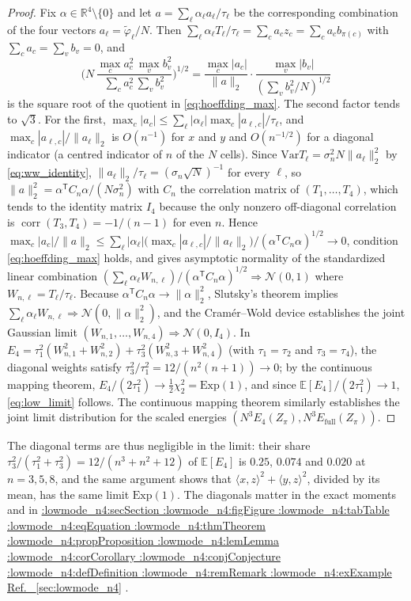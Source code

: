 \documentclass[11pt,a4paper]{article}
\makeatletter
\def\Cref@getprefix#1:#2\relax{#1}
\def\Cref@prefix@sec{sec}
\def\Cref@prefix@fig{fig}
\def\Cref@prefix@tab{tab}
\def\Cref@prefix@eq{eq}
\def\Cref@prefix@thm{thm}
\def\Cref@prefix@prop{prop}
\def\Cref@prefix@lem{lem}
\def\Cref@prefix@cor{cor}
\def\Cref@prefix@conj{conj}
\def\Cref@prefix@def{def}
\def\Cref@prefix@rem{rem}
\def\Cref@prefix@ex{ex}
\def\Cref@type@cap#1{%
  \edef\Cref@tmp{#1}%
  \ifx\Cref@tmp\Cref@prefix@sec Section%
  \else\ifx\Cref@tmp\Cref@prefix@fig Figure%
  \else\ifx\Cref@tmp\Cref@prefix@tab Table%
  \else\ifx\Cref@tmp\Cref@prefix@eq Equation%
  \else\ifx\Cref@tmp\Cref@prefix@thm Theorem%
  \else\ifx\Cref@tmp\Cref@prefix@prop Proposition%
  \else\ifx\Cref@tmp\Cref@prefix@lem Lemma%
  \else\ifx\Cref@tmp\Cref@prefix@cor Corollary%
  \else\ifx\Cref@tmp\Cref@prefix@conj Conjecture%
  \else\ifx\Cref@tmp\Cref@prefix@def Definition%
  \else\ifx\Cref@tmp\Cref@prefix@rem Remark%
  \else\ifx\Cref@tmp\Cref@prefix@ex Example%
  \else Ref.%
  \fi\fi\fi\fi\fi\fi\fi\fi\fi\fi\fi\fi
}
\DeclareRobustCommand{\Cref}[1]{%
  \begingroup
  \edef\Cref@label{#1}%
  \edef\Cref@prefix{\expandafter\Cref@getprefix\Cref@label:\relax}%
  \hyperref[#1]{\Cref@type@cap{\Cref@prefix}~\ref*{#1}}%
  \endgroup
}
\theoremstyle{plain}
\theoremstyle{definition}
\theoremstyle{remark}
\newcommand{\R}{\mathbb{R}}
\newcommand{\Var}{\mathrm{Var}}
\newcommand{\Efull}{E_{\mathrm{full}}}
\newcommand{\Efour}{E_4}
\newcommand{\E}{\mathbb{E}}
\makeatother
\begin{document}
\begin{proof}
Fix $\alpha\in\R^4\setminus\{0\}$ and let $a=\sum_\ell\alpha_\ell a_\ell/\tau_\ell$ be the corresponding combination of the four vectors $a_\ell=\tilde\varphi_\ell/N$.
Then $\sum_\ell\alpha_\ell T_\ell/\tau_\ell=\sum_ca_cz_c=\sum_ca_cb_{\pi(c)}$ with $\sum_ca_c=\sum_vb_v=0$, and
\[
\biggl(N\,\frac{\max_ca_c^2\,\max_vb_v^2}{\sum_ca_c^2\,\sum_vb_v^2}\biggr)^{1/2}=\frac{\max_c|a_c|}{\|a\|_2}\cdot\frac{\max_v|b_v|}{(\sum_vb_v^2/N)^{1/2}}
\]
is the square root of the quotient in \eqref{eq:hoeffding_max}.
The second factor tends to $\sqrt3$.
For the first, $\max_c|a_c|\le\sum_\ell|\alpha_\ell|\max_c|a_{\ell,c}|/\tau_\ell$, and $\max_c|a_{\ell,c}|/\|a_\ell\|_2$ is $O(n^{-1})$ for $x$ and $y$ and $O(n^{-1/2})$ for a diagonal indicator (a centred indicator of $n$ of the $N$ cells).
Since $\Var T_\ell=\sigma_n^2N\|a_\ell\|_2^2$ by \eqref{eq:ww_identity}, $\|a_\ell\|_2/\tau_\ell=(\sigma_n\sqrt N)^{-1}$ for every $\ell$, so $\|a\|_2^2=\alpha^{\mathsf T}C_n\alpha/(N\sigma_n^2)$ with $C_n$ the correlation matrix of $(T_1,\dots,T_4)$, which tends to the identity matrix $I_4$ because the only nonzero off-diagonal correlation is $\operatorname{corr}(T_3,T_4)=-1/(n-1)$ for even $n$.
Hence $\max_c|a_c|/\|a\|_2\le\sum_\ell|\alpha_\ell|\bigl(\max_c|a_{\ell,c}|/\|a_\ell\|_2\bigr)/(\alpha^{\mathsf T}C_n\alpha)^{1/2}\to0$, condition \eqref{eq:hoeffding_max} holds, and \cite[Thm.~4]{hoeffding1951} gives asymptotic normality of the standardized linear combination $(\sum_\ell\alpha_\ell W_{n,\ell})/(\alpha^{\mathsf T}C_n\alpha)^{1/2}\Rightarrow\mathcal N(0,1)$ where $W_{n,\ell}=T_\ell/\tau_\ell$.
Because $\alpha^{\mathsf T}C_n\alpha\to\|\alpha\|_2^2$, Slutsky's theorem implies $\sum_\ell\alpha_\ell W_{n,\ell}\Rightarrow\mathcal N(0,\|\alpha\|_2^2)$, and the Cram\'er--Wold device establishes the joint Gaussian limit $(W_{n,1},\dots,W_{n,4})\Rightarrow\mathcal N(0,I_4)$.
In $\Efour=\tau_1^2(W_{n,1}^2+W_{n,2}^2)+\tau_3^2(W_{n,3}^2+W_{n,4}^2)$ (with $\tau_1=\tau_2$ and $\tau_3=\tau_4$), the diagonal weights satisfy $\tau_3^2/\tau_1^2=12/(n^2(n+1))\to0$; by the continuous mapping theorem, $\Efour/(2\tau_1^2)\to\frac12\chi^2_2=\mathrm{Exp}(1)$, and since $\E[\Efour]/(2\tau_1^2)\to1$, \eqref{eq:low_limit} follows. The continuous mapping theorem similarly establishes the joint limit distribution for the scaled energies $(N^3\Efour(Z_\pi), N^3\Efull(Z_\pi))$.
\end{proof}

The diagonal terms are thus negligible in the limit: their share $\tau_3^2/(\tau_1^2+\tau_3^2)=12/(n^3+n^2+12)$ of $\E[\Efour]$ is $0.25$, $0.074$ and $0.020$ at $n=3,5,8$, and the same argument shows that $\langle x,z\rangle^2+\langle y,z\rangle^2$, divided by its mean, has the same limit $\mathrm{Exp}(1)$.
The diagonals matter in the exact moments and in \Cref{sec:lowmode_n4}.
\end{document}
